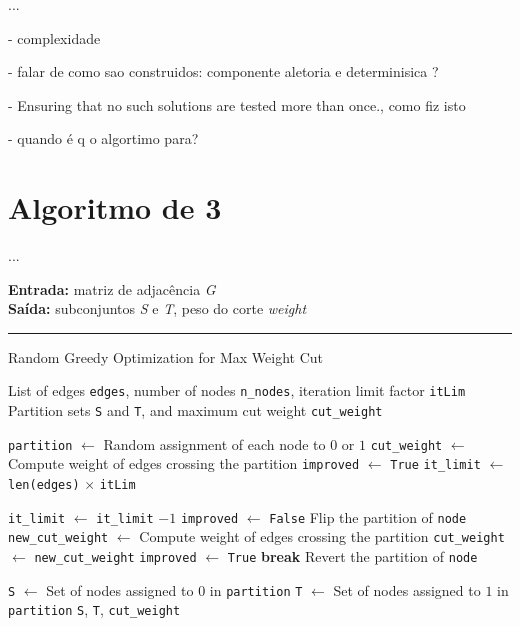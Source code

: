 \documentclass[mirror, portugues]{revdetua}
\begin{document}
    

...

- complexidade

- falar de como sao construidos: componente aletoria e determinisica ?

- Ensuring that no such solutions are tested more than once., como fiz isto

- quando é q o algortimo para?


\section{Algoritmo de 3}

...

\begin{algorithm}[H]
\raggedright
\textbf{Entrada:} matriz de adjacência \textit{G} \\
\textbf{Saída:} subconjuntos \textit{S} e \textit{T}, peso do corte \textit{weight} \\
\hrule 
\caption{Random Greedy Optimization for Max Weight Cut}
\begin{algorithmic}[1]
    \Require List of edges \texttt{edges}, number of nodes \texttt{n\_nodes}, iteration limit factor \texttt{itLim}
    \Ensure Partition sets \texttt{S} and \texttt{T}, and maximum cut weight \texttt{cut\_weight}

    \State \texttt{partition} $\gets$ Random assignment of each node to $0$ or $1$
    \State \texttt{cut\_weight} $\gets$ Compute weight of edges crossing the partition
    \State \texttt{improved} $\gets$ \texttt{True}
    \State \texttt{it\_limit} $\gets$ \texttt{len(edges)} \ensuremath{\times} \texttt{itLim}

        \State \texttt{it\_limit} $\gets$ \texttt{it\_limit} $- 1$
        \State \texttt{improved} $\gets$ \texttt{False}
            \State Flip the partition of \texttt{node}
            \State \texttt{new\_cut\_weight} $\gets$ Compute weight of edges crossing the partition
                \State \texttt{cut\_weight} $\gets$ \texttt{new\_cut\_weight}
                \State \texttt{improved} $\gets$ \texttt{True}
                \State \textbf{break}  
            \Else
                \State Revert the partition of \texttt{node}
            \EndIf
        \EndFor
    \EndWhile

    \State \texttt{S} $\gets$ Set of nodes assigned to $0$ in \texttt{partition}
    \State \texttt{T} $\gets$ Set of nodes assigned to $1$ in \texttt{partition}
    \Return \texttt{S}, \texttt{T}, \texttt{cut\_weight}
\end{algorithmic}
\end{algorithm}
    
\end{document}
